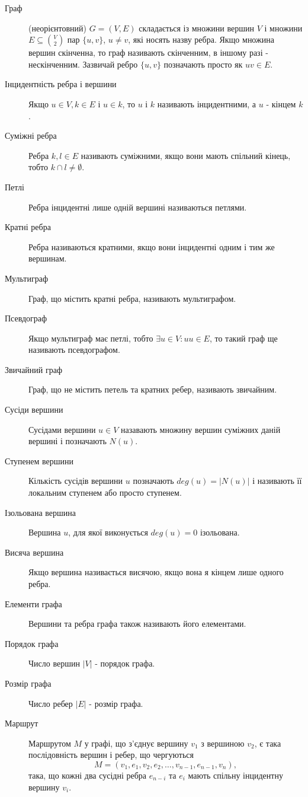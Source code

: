 \begin{description}
\item[Граф] (неорієнтовний) $G = (V,E)$ складається із множини вершин $V$ і множини $E \subseteq {V \choose 2}$ пар $\{u,v\}$, $u \neq v$, які носять назву ребра. Якщо множина вершин скінченна, то граф називають скінченним, в іншому разі - нескінченним.
  Зазвичай ребро $\lbrace u,v \rbrace$ позначають просто як $uv \in E$.
\item[Інцидентність ребра і вершини] Якщо $u \in V, k \in E$ і $u \in k$, то $u$ і $k$ називають інцидентними, а $u$ - кінцем $k$.
\item[Суміжні ребра] Ребра $k,l \in E$ називають суміжними, якщо вони мають спільний кінець, тобто $k \cap l \ne \emptyset$.
\item[Петлі] Ребра інцидентні лише одній вершині називаються петлями.
\item[Кратні ребра] Ребра називаються кратними, якщо вони інцидентні одним і тим же вершинам.
\item[Мультиграф] Граф, що містить кратні ребра, називають мультиграфом.
\item[Псевдограф] Якщо мультиграф має петлі, тобто $\exists u \in V : uu \in E$, то такий граф ще називають псевдографом.
\item[Звичайний граф] Граф, що не містить петель та кратних ребер, називають звичайним.
\item[Сусіди вершини] Сусідами вершини $u \in V$ назавають множину вершин суміжних даній вершині і позначають $N(u)$.
\item[Ступенем вершини] Кількість сусідів вершини $u$ позначають $deg(u) = \vert N(u) \vert$ і називають її локальним ступенем або просто ступенем.
\item[Ізольована вершина] Вершина $u$, для якої виконується $deg(u) = 0$ ізольована.
\item[Висяча вершина] Якщо вершина називається висячою, якщо вона я кінцем лише одного ребра.
\item[Елементи графа] Вершини та ребра графа також називають його елементами.
\item[Порядок графа] Число вершин $\vert V \vert$ - порядок графа.
\item[Розмір графа] Число ребер $\vert E \vert$ - розмір графа.
\item[Маршрут] Маршрутом $M$ у графі, що з'єднує вершину $v_1$ з вершиною $v_2$, є така послідовність вершин і ребер, що чергуються $$M=(v_1,e_1,v_2,e_2,\dots,v_{n-1},e_{n-1},v_n),$$ така, що кожні два сусідні ребра $e_{n-i}$ та $e_i$ мають спільну інцидентну вершину $v_i$.

\end{description}
